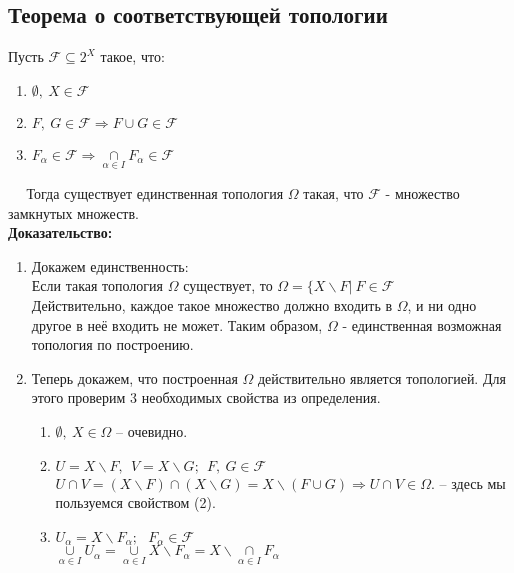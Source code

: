 \documentclass{article}
\begin{document}
\begin{spacing}{1.5}
\subsection{Теорема о соответствующей топологии}
  Пусть $ \mathcal{F} \subseteq 2^{X}$  такое, что:
\begin{enumerate}
\item $\emptyset ,~X\in \mathcal{F}$
\item $F,~G\in \mathcal{F} \Rightarrow F\cup G\in \mathcal{F}$
\item $F_{\alpha}\in \mathcal{F} \Rightarrow \underset{\alpha\in I}{\cap}F_{\alpha}\in \mathcal{F}$
\end{enumerate}
$~~~~~~$Тогда существует единственная топология $\Omega$ такая, что $\mathcal{F}$ - множество замкнутых множеств.
\\
\textbf{Доказательство:}
 \begin{enumerate}
\item Докажем единственность:\\
Если такая топология $\Omega$ существует, то $\Omega = \lbrace X\backslash F|~F\in \mathcal{F}$
\\ Действительно, каждое такое множество должно входить в $\Omega$, и ни одно другое в неё входить не может. Таким образом, $\Omega$ - единственная возможная топология по построению.
\item Теперь докажем, что построенная $\Omega$ действительно является топологией. Для этого проверим 3 необходимых свойства из определения.
\begin{enumerate}
\item $\emptyset,~X \in\Omega$ -- очевидно.
\item $U = X\backslash F,~~V=X\backslash G; ~~F,~G\in \mathcal{F}$
\\$U\cap V = (X\backslash F)\cap (X\backslash G)=X\backslash (F\cup G) \Rightarrow U\cap V\in\Omega.$ -- здесь мы пользуемся свойством (2).
\item $U_{\alpha} = X\backslash F_{\alpha};~~~F_{\alpha}\in \mathcal{F}$
\\$\underset{\alpha\in I}{\cup}U_{\alpha} = \underset{\alpha\in I}{\cup}X\backslash F_{\alpha} = X\backslash\underset{\alpha\in I}{\cap}F_{\alpha}$
\end{enumerate} 
\end{enumerate}




\end{spacing}
\end{document}
